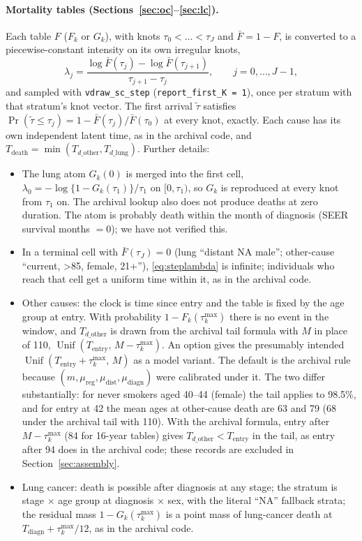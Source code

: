 \documentclass[11pt]{article}
\newcommand{\code}[1]{\texttt{#1}}
\newcommand{\Unif}{\operatorname{Unif}}
\newcommand{\Tentry}{T_{\mathrm{entry}}}
\newcommand{\Tdiagn}{T_{\mathrm{diagn}}}
\newcommand{\Tdo}{T_{d\_\mathrm{other}}}
\newcommand{\Tdl}{T_{d\_\mathrm{lung}}}
\newcommand{\Tdeath}{T_{\mathrm{death}}}
\begin{document}
\paragraph{Mortality tables (Sections~\ref{sec:oc}--\ref{sec:lc}).} Each table
$F$ ($F_k$ or $G_k$), with knots $\tau_0<\dots<\tau_J$ and $\bar F = 1-F$, is
converted to a piecewise-constant intensity on its own irregular knots,
\begin{equation}\label{eq:steplambda}
\lambda_j = \frac{\log \bar F(\tau_j) - \log \bar F(\tau_{j+1})}{\tau_{j+1}-\tau_j},\qquad j=0,\dots,J-1,
\end{equation}
and sampled with \code{vdraw\_sc\_step} (\code{report\_first\_K = 1}), once per stratum
with that stratum's knot vector. The first arrival $\tilde\tau$ satisfies
$\Pr(\tilde\tau\le\tau_j) = 1-\bar F(\tau_j)/\bar F(\tau_0)$ at every knot,
exactly. Each cause has its own independent latent time, as in the archival
code, and $\Tdeath=\min(\Tdo,\Tdl)$. Further details:
\begin{itemize}[nosep]
\item The lung atom $G_k(0)$ is merged into the first cell,
  $\lambda_0 = -\log\{1-G_k(\tau_1)\}/\tau_1$ on $[0,\tau_1)$, so $G_k$ is
  reproduced at every knot from $\tau_1$ on. The archival lookup also does not
  produce deaths at zero duration. The atom is probably death within the month of
  diagnosis (SEER survival months $=0$); we have not verified this.
\item In a terminal cell with $\bar F(\tau_J)=0$ (lung ``distant NA male'';
  other-cause ``current, >85, female, 21+''), \eqref{eq:steplambda} is infinite;
  individuals who reach that cell get a uniform time within it, as in the archival
  code.
\item Other causes: the clock is time since entry and the table is fixed by the
  age group at entry. With probability $1-F_k(\tau^{\max}_k)$ there is no event
  in the window, and $\Tdo$ is drawn from the archival tail formula with $M$ in
  place of 110, $\Unif(\Tentry,\,M-\tau^{\max}_k)$. An option gives the
  presumably intended $\Unif(\Tentry+\tau^{\max}_k,\,M)$ as a model variant. The default is the
  archival rule because $(m,\mu_{\mathrm{reg}},\mu_{\mathrm{dist}},\mu_{\mathrm{diagn}})$
  were calibrated under it. The two differ substantially: for never smokers aged
  40--44 (female) the tail applies to 98.5\%, and for entry at 42 the mean ages
  at other-cause death are 63 and 79 (68 under the archival tail with 110).
  With the archival formula, entry after $M-\tau^{\max}_k$ (84 for 16-year
  tables) gives $\Tdo<\Tentry$ in the tail, as entry after 94 does in the
  archival code; these records are excluded in Section~\ref{sec:assembly}.
\item Lung cancer: death is possible after diagnosis at any stage; the stratum
  is stage $\times$ age group at diagnosis $\times$ sex, with the literal ``NA''
  fallback strata; the residual mass $1-G_k(\tau^{\max}_k)$ is a point mass of
  lung-cancer death at $\Tdiagn+\tau^{\max}_k/12$, as in the archival code.
\end{itemize}
\end{document}
